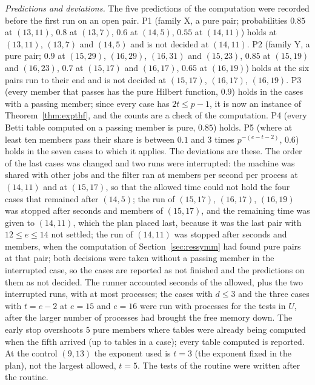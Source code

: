 \documentclass[11pt]{article}
\theoremstyle{definition}
\theoremstyle{remark}
\begin{document}
\emph{Predictions and deviations.} The five predictions of the computation were recorded before the first run on an open pair. P1 (family X, a pure pair; probabilities $0.85$ at $(13,11)$, $0.8$ at $(13,7)$, $0.6$ at $(14,5)$, $0.55$ at $(14,11)$) holds at $(13,11)$, $(13,7)$ and $(14,5)$ and is not decided at $(14,11)$. P2 (family Y, a pure pair; $0.9$ at $(15,29)$, $(16,29)$, $(16,31)$ and $(15,23)$, $0.85$ at $(15,19)$ and $(16,23)$, $0.7$ at $(15,17)$ and $(16,17)$, $0.65$ at $(16,19)$) holds at the six pairs run to their end and is not decided at $(15,17)$, $(16,17)$, $(16,19)$. P3 (every member that passes has the pure Hilbert function, $0.9$) holds in the \nevtPassingCases{} cases with a passing member; since every case has $2t\le p-1$, it is now an instance of Theorem~\ref{thm:expthf}, and the counts are a check of the computation. P4 (every Betti table computed on a passing member is pure, $0.85$) holds. P5 (where at least ten members pass their share is between $0.1$ and $3$ times $p^{-(e-t-2)}$, $0.6$) holds in the seven cases to which it applies. The deviations are these. The order of the last cases was changed and two runs were interrupted: the machine was shared with other jobs and the filter ran at \nevtRateFourteenEleven{} members per second per process at $(14,11)$ and \nevtRateFifteenSeventeen{} at $(15,17)$, so that the allowed time could not hold the four cases that remained after $(14,5)$; the run of $(15,17)$, $(16,17)$, $(16,19)$ was stopped after \nevtWallFifteenSeventeen{} seconds and \nevtFifteenSeventeenExamined{} members of $(15,17)$, and the remaining time was given to $(14,11)$, which the plan placed last, because it was the last pair with $12\le e\le14$ not settled; the run of $(14,11)$ was stopped after \nevtWallFourteenEleven{} seconds and \nevtFourteenElevenExamined{} members, when the computation of Section~\ref{sec:ressymm} had found pure pairs at that pair; both decisions were taken without a passing member in the interrupted case, so the cases are reported as not finished and the predictions on them as not decided. The runner accounted \nevtSeconds{} seconds of the \nevtLimit{} allowed, plus the two interrupted runs, with at most \nevtWorkersMax{} processes; the cases with $d\le3$ and the three cases with $t=e-2$ at $e=15$ and $e=16$ were run with \nevtWorkersMin{} processes for the tests in $U$, after the larger number of processes had brought the free memory down. The early stop overshoots $5$ pure members where tables were already being computed when the fifth arrived (up to \nevtMaxTables{} tables in a case); every table computed is reported. At the control $(9,13)$ the exponent used is $t=3$ (the exponent fixed in the plan), not the largest allowed, $t=5$. The tests of the routine were written after the routine.
\end{document}
